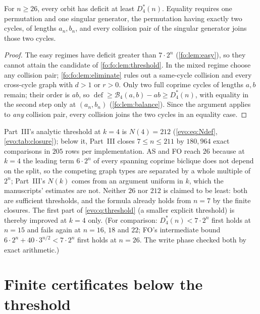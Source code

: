 \documentclass[11pt,a4paper]{article}
\numberwithin{equation}{section}
\theoremstyle{definition}
\theoremstyle{remark}
\newcommand{\Bip}{\mathcal B}
\newcommand{\defi}{\operatorname{def}}
\begin{document}
\begin{proposition}\label{fo:fo:prop:large}
For $n\ge26$, every orbit has deficit at least $D^*_4(n)$. Equality requires
one permutation and one singular generator, the permutation having exactly
two cycles, of lengths $a_n,b_n$, and every collision pair of the singular
generator joins those two cycles.
\end{proposition}

\begin{proof}
The easy regimes have deficit greater than $7\cdot2^n$
(\cref{fo:lem:easy}), so they cannot attain the candidate of
\cref{fo:fo:lem:threshold}. In the mixed regime choose any collision pair;
\cref{fo:fo:lem:eliminate} rules out a same-cycle collision and every
cross-cycle graph with $d>1$ or $r>0$. Only two full coprime cycles of
lengths $a,b$ remain; their order is $ab$, so $\defi\ge\Bip_4(a,b)-ab\ge D^*_4(n)$,
with equality in the second step only at $(a_n,b_n)$
(\cref{fo:lem:balance}). Since the argument applies to \emph{any} collision
pair, every collision joins the two cycles in an equality case.
\end{proof}

\begin{remark}\label{fo:rem:threshold}
Part~III's analytic threshold at $k=4$ is $N(4)=212$ (\cref{evo:eq:Ndef},
\cref{evo:tab:closure}); below it, Part~III closes $7\le n\le211$ by
$180{,}964$ exact comparisons in $205$ rows per implementation. AS and FO
reach $26$ because at $k=4$ the leading term $6\cdot2^n$ of every spanning
coprime biclique does not depend on the split, so the competing graph types
are separated by a whole multiple of $2^n$; Part~III's $N(k)$ comes from an
argument uniform in $k$, which the manuscripts' estimates are not. Neither
$26$ nor $212$ is claimed to be least: both are sufficient thresholds, and the
formula already holds from $n=7$ by the finite closures. The first part of
\cref{evo:q:threshold} (a smaller explicit threshold) is thereby improved at
$k=4$ only. (For comparison: $D^*_4(n)<7\cdot2^n$ first holds at $n=15$ and
fails again at $n=16$, $18$ and $22$; FO's intermediate bound
$6\cdot2^n+40\cdot3^{n/2}<7\cdot2^n$ first holds at $n=26$. The write phase
checked both by exact arithmetic.)
\end{remark}

\section{Finite certificates below the threshold}\label{fo:sec:finite}
\end{document}
